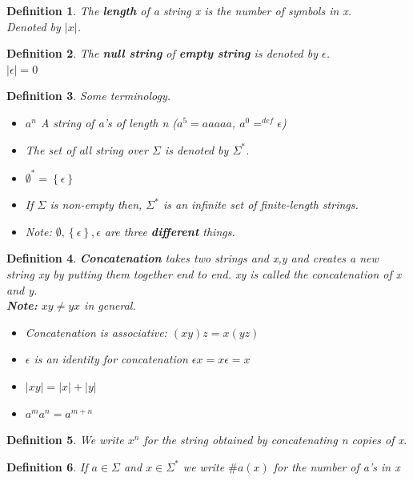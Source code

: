 \documentclass[a4paper]{article}
\newtheorem{definition}{Definition}
\begin{document}
\begin{definition}
    The \textbf{length} of a string x is the number of symbols in x.\\
    Denoted by $|x|$.
\end{definition}
\begin{definition}
    The \textbf{null string} of \textbf{empty string} is denoted by $\epsilon$.\\
    $|\epsilon|=0$
\end{definition}
\begin{definition}
    Some terminology.
    \begin{itemize}
        \item $a^n$ A string of a's of length n ($a^5=aaaaa$, $a^0=^{def}\epsilon$)
        \item The set of all string over $\Sigma$ is denoted by $\Sigma^*$.
        \item $\emptyset^*=\left\{ \epsilon \right\}$
        \item If $\Sigma$ is non-empty then, $\Sigma^*$ is an infinite set of
            finite-length strings.
        \item Note: $\emptyset,\left\{ \epsilon \right\}, \epsilon$ are three
            \textbf{different} things.
    \end{itemize}
\end{definition}
\begin{definition}
    \textbf{Concatenation} takes two strings and x,y and creates a new string xy
            by putting them together end to end. xy is called the concatenation of x and y.\\
            \textbf{Note:} $xy \neq yx$ in general.
            \begin{itemize}
                \item Concatenation is associative: $(xy)z=x(yz)$
                \item $\epsilon$ is an identity for concatenation $\epsilon x=x\epsilon = x$
                \item $|xy|=|x|+|y|$
                \item $a^ma^n=a^{m+n}$
            \end{itemize}
\end{definition}
\begin{definition}
    We write $x^n$ for the string obtained by concatenating n copies of x.
\end{definition}
\begin{definition}
    If $a\in\Sigma$ and $x\in\Sigma^*$ we write $\#a(x)$ for the number
            of a's in x
\end{definition}
\end{document}
